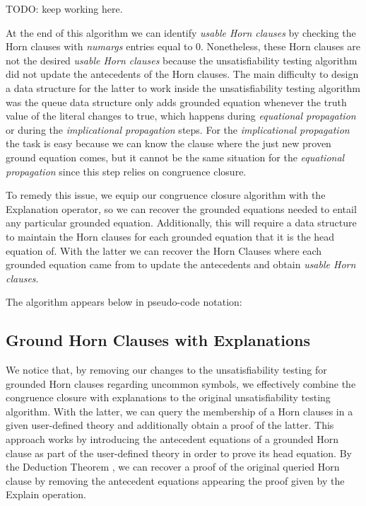 TODO: keep working here.

At the end of this algorithm we can identify 
\emph{usable Horn clauses} by checking the Horn clauses
with \emph{numargs} entries equal to 0. Nonetheless, these 
Horn clauses are not the
desired \emph{usable Horn clauses} because the 
unsatisfiability testing algorithm
did not update the antecedents of the Horn clauses. 
The main difficulty to design a data structure
for the latter to work inside the unsatisfiability 
testing algorithm was the queue data structure
only adds grounded equation whenever the truth 
value of the literal changes to true, which happens
during \emph{equational propagation} or during 
the \emph{implicational propagation} steps.
For the \emph{implicational propagation} the task is 
easy because we can know the clause
where the just new proven ground equation comes, 
but it cannot be the same situation
for the \emph{equational propagation} since this 
step relies on congruence closure.

To remedy this issue, we equip our congruence closure 
algorithm with the Explanation operator, so
we can recover the grounded equations needed to entail 
any particular grounded equation. Additionally,
this will require a data structure to maintain the Horn 
clauses for each grounded equation that
it is the head equation of. With the latter we can 
recover the Horn Clauses where each grounded
equation came from to update the antecedents and 
obtain \emph{usable Horn clauses}.

The algorithm appears below in pseudo-code notation:





\subsection{Ground Horn Clauses with Explanations}

We notice that, by removing our changes to the unsatisfiability testing
for grounded Horn clauses regarding uncommon symbols, we effectively combine
the congruence closure with explanations to the original unsatisfiability
testing algorithm. With the latter, we can query the membership of a Horn
clauses in a given user-defined theory and additionally obtain a proof of
the latter. This approach works by introducing the antecedent equations of
a grounded Horn clause as part of the user-defined theory in order to prove
its head equation. By the Deduction Theorem \cite{10.5555/1642730}, we can
recover a proof of the original queried Horn clause by removing the antecedent
equations appearing the proof given by the Explain operation.

